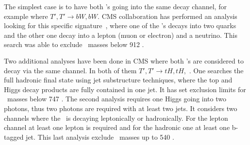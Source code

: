 The simplest case is to have both \Tp's going into the same decay channel, for example where ${T',T'\rightarrow bW,bW}$. CMS collaboration has performed an analysis looking for this specific signature~\cite{CMS-PAS-B2G-12-017}, where one of the \W's decays into two quarks and the other one decay into a lepton (muon or electron) and a neutrino. This search was able to exclude \Tp~masses below 912 \GeVcc.
%

Two additional analyses have been done in CMS where both \Tp's are considered to decay via the same channel. In both of them ${T',T'\rightarrow tH,tH}$,~\cite{Khachatryan:2015axa,CMS-PAS-B2G-14-003}. One searches the full hadronic final state using jet substructure techniques, where the top and Higgs decay products are fully contained in one jet. It has set exclusion limits for \Tp~masses below 747 \GeVcc. The second analysis requires one Higgs going into two photons, thus two photons are required with at least two jets. It considers two channels where the \W~is decaying leptonically or hadronically. For the lepton channel at least one lepton is required and for the hadronic one at least one b-tagged jet. This last analysis exclude \Tp~masses up to 540 \GeVcc.
%

